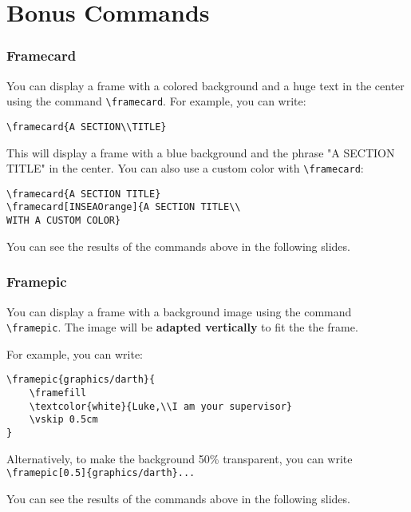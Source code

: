 \documentclass[usenames,dvipsnames,10pt,aspectratio=169]{beamer}
\newcommand{\framefill}{\vskip0pt plus 1filll}
\begin{document}
\section{Bonus Commands}

\begin{frame}[fragile]
\frametitle{Framecard}

You can display a frame with a colored background and a huge text in the center using the command \texttt{\textbackslash framecard}.
\vskip 0.5cm 
For example, you can write:
\begin{verbatim}
\framecard{A SECTION\\TITLE}
\end{verbatim}

This will display a frame with a blue background and the phrase "A SECTION TITLE" in the center. You can also use a custom color with \texttt{\textbackslash framecard}:
\begin{verbatim}
\framecard{A SECTION TITLE}
\framecard[INSEAOrange]{A SECTION TITLE\\
WITH A CUSTOM COLOR}
\end{verbatim}
You can see the results of the commands above in the following slides.

\end{frame}


\begin{frame}[fragile]
\frametitle{Framepic}

You can display a frame with a background image using the command \texttt{\textbackslash framepic}. The image will be \textbf{adapted vertically} to fit the the frame. 

For example, you can write:
\begin{verbatim}
\framepic{graphics/darth}{
	\framefill
    \textcolor{white}{Luke,\\I am your supervisor}
    \vskip 0.5cm
}
\end{verbatim}

Alternatively, to make the background 50\% transparent, you can write \texttt{\textbackslash framepic[0.5]\{graphics/darth\}...}


You can see the results of the commands above in the following slides.

\end{frame}
\end{document}
